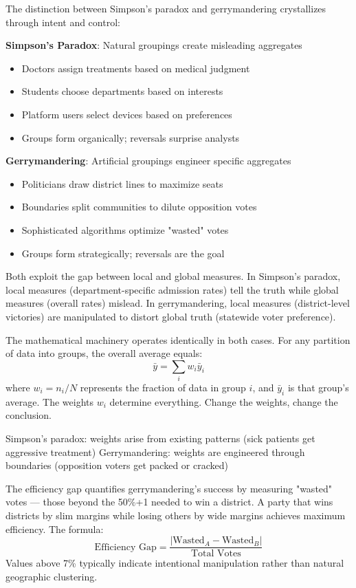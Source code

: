 The distinction between Simpson's paradox and gerrymandering crystallizes through intent and control:

\textbf{Simpson's Paradox}: Natural groupings create misleading aggregates
\begin{itemize}
\item Doctors assign treatments based on medical judgment
\item Students choose departments based on interests
\item Platform users select devices based on preferences
\item Groups form organically; reversals surprise analysts
\end{itemize}

\textbf{Gerrymandering}: Artificial groupings engineer specific aggregates
\begin{itemize}
\item Politicians draw district lines to maximize seats
\item Boundaries split communities to dilute opposition votes
\item Sophisticated algorithms optimize "wasted" votes
\item Groups form strategically; reversals are the goal
\end{itemize}

Both exploit the gap between local and global measures. In Simpson's paradox, local measures (department-specific admission rates) tell the truth while global measures (overall rates) mislead. In gerrymandering, local measures (district-level victories) are manipulated to distort global truth (statewide voter preference).

The mathematical machinery operates identically in both cases. For any partition of data into groups, the overall average equals:
\[
\bar{y} = \sum_{i} w_i \bar{y}_i
\]
where $w_i = n_i/N$ represents the fraction of data in group $i$, and $\bar{y}_i$ is that group's average. The weights $w_i$ determine everything. Change the weights, change the conclusion.

Simpson's paradox: weights arise from existing patterns (sick patients get aggressive treatment)
Gerrymandering: weights are engineered through boundaries (opposition voters get packed or cracked)

The efficiency gap quantifies gerrymandering's success by measuring "wasted" votes — those beyond the 50\%+1 needed to win a district. A party that wins districts by slim margins while losing others by wide margins achieves maximum efficiency. The formula:
\[
\text{Efficiency Gap} = \frac{|\text{Wasted}_A - \text{Wasted}_B|}{\text{Total Votes}}
\]
Values above 7\% typically indicate intentional manipulation rather than natural geographic clustering.

